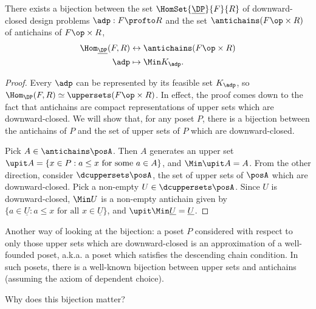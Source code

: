 \begin{lemma}
	There exists a bijection between the set $\HomSet{\underline{\DP}}{F}{R}$ of downward-closed design problems $\adp : F \profto R$ and the set $\antichains (F\op \times R)$ of antichains of $F\op \times R$, %
	\begin{equation}
		\begin{aligned}
			\Hom_{\underline{\DP}}(F,R) & \leftrightarrow \antichains (F\op \times R) \\
			\adp                        & \mapsto \Min K_\adp.
		\end{aligned}
	\end{equation}
\end{lemma}
\begin{proof}
	Every $\adp$ can be represented by its feasible set $K_\adp$, so $\Hom_\DP(F,R) \simeq \uppersets (F\op \times R)$.
	In effect, the proof comes down to the fact that antichains are compact representations of upper sets which are downward-closed.
	We will show that, for any poset $P$, there is a bijection between the antichains of $P$ and the set of upper sets of $P$ which are downward-closed.

	Pick $A \in \antichains\posA$.
	Then $A$ generates an upper set $\upit A = \{ x \in P : a \leq x \text{ for some $a \in A$} \}$, and $\Min \upit A = A$.
	From the other direction, consider $\dcuppersets \posA$, the set of upper sets of $\posA$ which are downward-closed.
	Pick a non-empty $U \in \dcuppersets \posA$.
	Since $U$ is downward-closed, $\Min U$ is a non-empty antichain given by $\{ a \in \underline{U} : a \leq x \text{ for all $x \in \underline{U}$} \}$, and $\upit \Min \underline{U} = \underline{U}$.
\end{proof}

\begin{remark}
	Another way of looking at the bijection: a poset $P$ considered with respect to only those upper sets which are downward-closed is an approximation of a well-founded poset, a.k.a.
	a poset which satisfies the descending chain condition.
	In such posets, there is a well-known bijection between upper sets and antichains (assuming the axiom of dependent choice).
\end{remark}
Why does this bijection matter?

